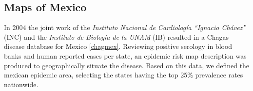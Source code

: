 \subsection{Maps of Mexico}

In 2004 the joint work of the \textit{Instituto Nacional de Cardiología “Ignacio Chávez”} (INC) and the \textit{Instituto de Biología de la UNAM } (IB) resulted in a Chagas disease database for Mexico \ref{chagmex}. Reviewing positive serology in blood banks and human reported cases per state, an epidemic risk map description was produced to geographically situate the disease. Based on this data, we defined the mexican epidemic area, selecting the states having the top 25\% prevalence rates nationwide. 
